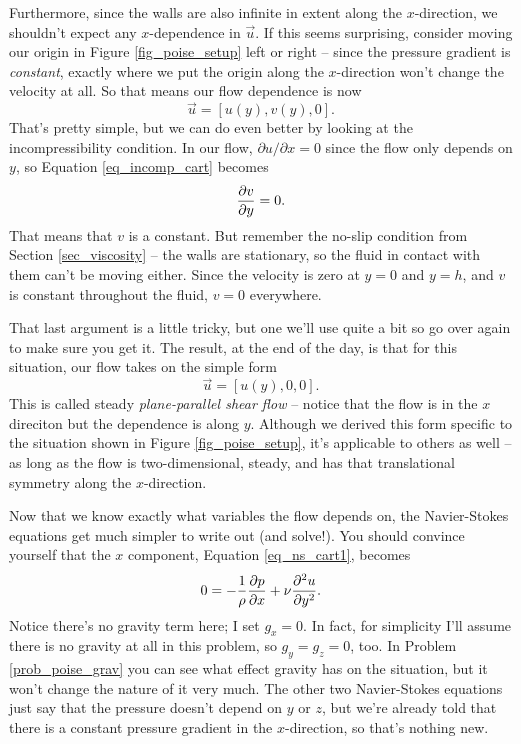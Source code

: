 Furthermore, since the walls are also infinite in extent along the $x$-direction, we shouldn't expect any $x$-dependence in $\vec{u}$.  If this seems surprising, consider moving our origin in Figure \ref{fig_poise_setup} left or right -- since the pressure gradient is \emph{constant}, exactly where we put the origin along the $x$-direction won't change the velocity at all.  So that means our flow dependence is now
\[
\vec{u} = [u(y), v(y), 0].
\]
That's pretty simple, but we can do even better by looking at the incompressibility condition.  In our flow, $\partial u /\partial x = 0$ since the flow only depends on $y$, so Equation \ref{eq_incomp_cart} becomes
\[
\frac{\partial {v}}{\partial {y}} = 0.
\]
That means that $v$ is a constant.  But remember the no-slip condition from Section \ref{sec_viscosity} -- the walls are stationary, so the fluid in contact with them can't be moving either.  Since the velocity is zero at $y=0$ and $y=h$, and $v$ is constant throughout the fluid, $v=0$ everywhere.

That last argument is a little tricky, but one we'll use quite a bit so go over again to make sure you get it.  The result, at the end of the day, is that for this situation, our flow takes on the simple form
\begin{equation}
\vec{u} = [u(y), 0, 0].
\end{equation}
This is called steady \emph{plane-parallel shear flow} -- notice that the flow is in the $x$ direciton but the dependence is along $y$.  Although we derived this form specific to the situation shown in Figure \ref{fig_poise_setup}, it's applicable to others as well -- as long as the flow is two-dimensional, steady, and has that translational symmetry along the $x$-direction.

Now that we know exactly what variables the flow depends on, the Navier-Stokes equations get much simpler to write out (and solve!).  You should convince yourself that the $x$ component, Equation \ref{eq_ns_cart1}, becomes
\begin{equation}
\label{eq_poise_diffeq}
0 = -\frac{1}{\rho} \frac{\partial {p}}{\partial {x}} + \nu \frac{\partial^2 {u}}{\partial {y}^2}.
\end{equation}
Notice there's no gravity term here; I set $g_x = 0$. In fact, for simplicity I'll assume there is no gravity at all in this problem, so $g_y = g_z = 0$, too.  In Problem \ref{prob_poise_grav} you can see what effect gravity has on the situation, but it won't change the nature of it very much.  The other two Navier-Stokes equations just say that the pressure doesn't depend on $y$ or $z$, but we're already told that there is a constant pressure gradient in the $x$-direction, so that's nothing new.

